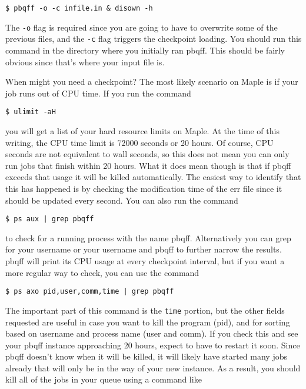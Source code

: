\documentclass{article}
\begin{document}
\begin{verbatim}
$ pbqff -o -c infile.in & disown -h
\end{verbatim}

The \verb|-o| flag is required since you are going to have to
overwrite some of the previous files, and the \verb|-c| flag triggers
the checkpoint loading. You should run this command in the directory
where you initially ran pbqff. This should be fairly obvious since
that's where your input file is.

When might you need a checkpoint? The most likely scenario on Maple is
if your job runs out of CPU time. If you run the command

\begin{verbatim}
$ ulimit -aH
\end{verbatim}

\noindent
you will get a list of your hard resource limits on Maple. At the time
of this writing, the CPU time limit is 72000 seconds or 20 hours. Of
course, CPU seconds are not equivalent to wall seconds, so this does
not mean you can only run jobs that finish within 20 hours. What it
does mean though is that if pbqff exceeds that usage it will be killed
automatically. The easiest way to identify that this has happened is
by checking the modification time of the err file since it should be
updated every second. You can also run the command

\begin{verbatim}
$ ps aux | grep pbqff
\end{verbatim}

\noindent
to check for a running process with the name pbqff. Alternatively you
can grep for your username or your username and pbqff to further
narrow the results. pbqff will print its CPU usage at every checkpoint
interval, but if you want a more regular way to check, you can use the
command

\begin{verbatim}
$ ps axo pid,user,comm,time | grep pbqff
\end{verbatim}

\noindent
The important part of this command is the \verb|time| portion, but the
other fields requested are useful in case you want to kill the program
(pid), and for sorting based on username and process name (user and
comm). If you check this and see your pbqff instance approaching 20
hours, expect to have to restart it soon. Since pbqff doesn't know
when it will be killed, it will likely have started many jobs already
that will only be in the way of your new instance. As a result, you
should kill all of the jobs in your queue using a command like
\end{document}
